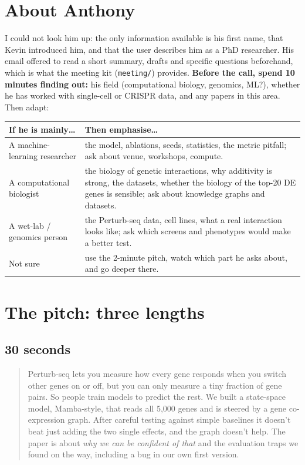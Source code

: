\documentclass[10.5pt]{article}
\begin{document}
\section{About Anthony}
I could not look him up: the only information available is his first name, that Kevin introduced him, and
that the user describes him as a PhD researcher. His email offered to read a short summary, drafts and
specific questions beforehand, which is what the meeting kit (\texttt{meeting/}) provides.
\textbf{Before the call, spend 10 minutes finding out:} his field (computational biology, genomics, ML?),
whether he has worked with single-cell or CRISPR data, and any papers in this area. Then adapt:

\begin{tabular}{@{}p{4.4cm}p{11.1cm}@{}}
\toprule
If he is mainly\ldots & Then emphasise\ldots\\
\midrule
A machine-learning researcher & the model, ablations, seeds, statistics, the metric pitfall; ask about
venue, workshops, compute.\\
A computational biologist & the biology of genetic interactions, why additivity is strong, the datasets,
whether the biology of the top-20 DE genes is sensible; ask about knowledge graphs and datasets.\\
A wet-lab / genomics person & the Perturb-seq data, cell lines, what a real interaction looks like; ask
which screens and phenotypes would make a better test.\\
Not sure & use the 2-minute pitch, watch which part he asks about, and go deeper there.\\
\bottomrule
\end{tabular}

\section{The pitch: three lengths}

\subsection*{30 seconds}
\begin{quote}
Perturb-seq lets you measure how every gene responds when you switch other genes on or off, but you can
only measure a tiny fraction of gene pairs. So people train models to predict the rest. We built a
state-space model, Mamba-style, that reads all 5,000 genes and is steered by a gene co-expression graph.
After careful testing against simple baselines it doesn't beat just adding the two single effects, and the
graph doesn't help. The paper is about \emph{why we can be confident of that} and the evaluation traps we
found on the way, including a bug in our own first version.
\end{quote}
\end{document}

